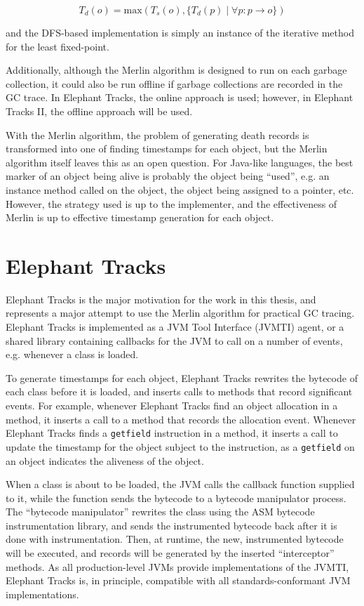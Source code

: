 \begin{equation*}
  T_d(o) = \mathrm{max}(T_s(o), \{T_d(p) \mid \forall p : p \rightarrow o\})
\end{equation*}

and the DFS-based implementation is simply an instance of the iterative method for the least fixed-point.

Additionally, although the Merlin algorithm is designed to run on each garbage collection,
it could also be run offline if garbage collections are recorded in the GC trace. In Elephant Tracks, the online
approach is used; however, in Elephant Tracks II, the offline approach will be used.

With the Merlin algorithm, the problem of generating death records is transformed into one of finding timestamps
for each object, but the Merlin algorithm itself leaves this as an open question. For Java-like languages, the
best marker of an object being alive is probably the object being ``used'', e.g. an instance method called on the
object, the object being assigned to a pointer, etc. However, the strategy used is up to the implementer, and
the effectiveness of Merlin is up to effective timestamp generation for each object.

\section{Elephant Tracks}
Elephant Tracks \citep{ElephantTracks} is the major motivation for the work in this thesis, and represents a major attempt
to use the Merlin algorithm for practical GC tracing. Elephant Tracks is implemented as a JVM Tool Interface (JVMTI) agent, or a shared library
containing callbacks for the JVM to call on a number of events, e.g. whenever a class is loaded.

To generate timestamps for each object, Elephant Tracks rewrites the bytecode of each class before it is loaded, and inserts
calls to methods that record significant events. For example, whenever Elephant Tracks find an object allocation in a method,
it inserts a call to a method that records the allocation event. Whenever Elephant Tracks finds a \texttt{getfield} instruction
in a method, it inserts a call to update the timestamp for the object subject to the instruction, as a \texttt{getfield} on an
object indicates the aliveness of the object.

When a class is about to be loaded, the JVM calls the callback function supplied to it,
while the function sends the bytecode to a bytecode manipulator process. The ``bytecode manipulator'' rewrites the class using
the ASM bytecode instrumentation library, and sends the instrumented bytecode back after it is done with instrumentation. Then, at
runtime, the new, instrumented bytecode will be executed, and records will be generated by the inserted ``interceptor'' methods. As
all production-level JVMs provide implementations of the JVMTI, Elephant Tracks is, in principle, compatible with all standards-conformant
JVM implementations.

